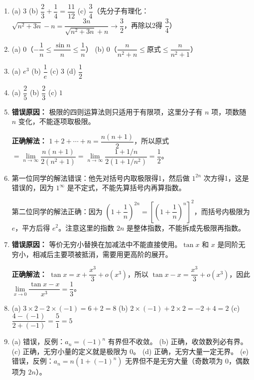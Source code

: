 \documentclass{ctexart}
\begin{document}
\begin{example}[加减结构中的错误示例]
\begin{enumerate}
\item[1.] 
   (a) \(3\) \quad (b) \(\dfrac{2}{3} + \dfrac{1}{4} = \dfrac{11}{12}\) \quad (c) \(\dfrac{3}{4}\)（先分子有理化：\(\sqrt{n^2+3n} - n = \dfrac{3n}{\sqrt{n^2+3n}+n} \to \dfrac{3}{2}\)，再除以2得 \(\dfrac{3}{4}\)）

\item[2.] 
   (a) \(0\)（\(-\dfrac{1}{n} \leq \dfrac{\sin n}{n} \leq \dfrac{1}{n}\)）\quad 
   (b) \(0\)（\(\dfrac{n}{n^2+n} \leq \text{原式} \leq \dfrac{n}{n^2+1}\)）

\item[3.] 
   (a) \(e^3\) \quad (b) \(\dfrac{1}{e}\) \quad (c) \(3\) \quad (d) \(\dfrac{1}{2}\)

\item[4.] 
   (a) \(\dfrac{2}{5}\) \quad (b) \(\dfrac{2}{3}\) \quad (c) \(1\)

\item[5.] 
   \textbf{错误原因：} 极限的四则运算法则只适用于有限项，这里分子有 \(n\) 项，项数随 \(n\) 变化，不能逐项取极限。
   
   \textbf{正确解法：} \(1+2+\cdots+n = \dfrac{n(n+1)}{2}\)，所以原式 \(= \lim\limits_{n\to\infty} \dfrac{n(n+1)}{2(n^2+1)} = \lim\limits_{n\to\infty} \dfrac{1+1/n}{2(1+1/n^2)} = \dfrac{1}{2}\)。

\item[6.] 
   第一位同学的解法错误：他先对括号内取极限得1，然后做 \(1^{2n}\) 次方得1，这是错误的，因为 \(1^\infty\) 是不定式，不能先算括号内再算指数。
   
   第二位同学的解法正确：因为 \(\left(1+\dfrac{1}{n}\right)^{2n} = \left[\left(1+\dfrac{1}{n}\right)^n\right]^2\)，而括号内极限为 \(e\)，平方后得 \(e^2\)。注意这里的指数 \(2n\) 是整体指数，不能拆成先极限再指数。

\item[7.] 
   \textbf{错误原因：} 等价无穷小替换在加减法中不能直接使用。\(\tan x\) 和 \(x\) 是同阶无穷小，相减后主要项被抵消，需要用更高阶的展开。
   
   \textbf{正确解法：} \(\tan x = x + \dfrac{x^3}{3} + o(x^3)\)，所以 \(\tan x - x = \dfrac{x^3}{3} + o(x^3)\)，因此 \(\lim\limits_{x\to 0} \dfrac{\tan x - x}{x^3} = \dfrac{1}{3}\)。

\item[8.] 
   (a) \(3 \times 2 - 2 \times (-1) = 6 + 2 = 8\) \quad
   (b) \(2 \times (-1) + 2 \times 2 = -2 + 4 = 2\) \quad
   (c) \(\dfrac{4 - (-1)}{2 + (-1)} = \dfrac{5}{1} = 5\)

\item[9.] 
   (a) 错误，反例：\(a_n = (-1)^n\) 有界但不收敛。\quad
   (b) 正确，收敛数列必有界。\quad
   (c) 正确，无穷小量的定义就是极限为 0。\quad
   (d) 正确，无穷大量一定无界。\quad
   (e) 错误，反例：\(a_n = n(1+(-1)^n)\) 无界但不是无穷大量（奇数项为 0，偶数项为 \(2n\)）。


\end{enumerate}
\end{example}
\end{document}
